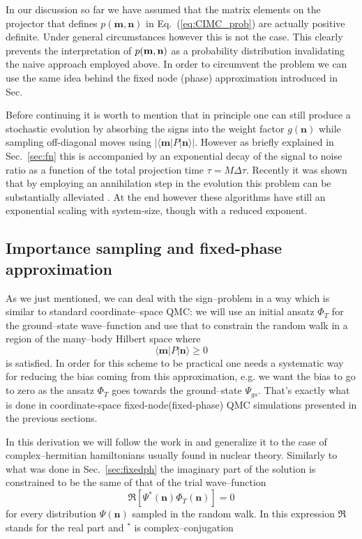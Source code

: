 In our discussion so far we have assumed that the matrix elements on the projector that defines $p(\mathbf{m},\mathbf{n})$ in Eq.~(\eqref{eq:CIMC_prob}) are
actually positive definite. Under general circumstances however this is not the case. This clearly prevents the interpretation 
of $p({\bf m},{\bf n})$ as a probability distribution invalidating the naive approach employed above. In order to circumvent the problem we can use the same idea behind the
fixed node (phase) approximation introduced in Sec.~\label{sec:fn}

Before continuing it is worth to mention that in principle one can still produce a stochastic evolution by absorbing the signs into the weight factor $g(\mathbf{n})$
while sampling off-diagonal moves using $\left \vert \langle \mathbf{m} \lvert P \rvert \mathbf{n} \rangle \right\vert$. However as briefly explained in Sec.~\ref{sec:fn} 
this is accompanied by an exponential decay of the signal to noise ratio as a function of the total projection time $\tau = M \Delta\tau$. Recently it was shown 
that by employing an annihilation step in the evolution this problem can be substantially alleviated \cite{Booth09,Petruzielo12,Booth13}. At the end however these 
algorithms have still an exponential scaling with system-size, though with a reduced exponent.

\subsection{Importance sampling and fixed-phase approximation}
\label{subsect:CCDMC-IS}
As we just mentioned, we can deal with the sign--problem in a way which is similar to standard coordinate--space QMC: we will use an initial ansatz $\Phi_T$ 
for the ground--state wave--function and use that to constrain the random walk in a region of the many--body Hilbert space where 
\begin{equation}
\langle \mathbf{m} \lvert P \rvert \mathbf{n} \rangle \geq 0
\end{equation}
is satisfied. In order for this scheme to be practical one needs a systematic way for reducing the bias coming from this approximation, e.g. we want the bias 
to go to zero as the ansatz $\Phi_T$ goes towards the ground--state $\Psi_{gs}$. That's exactly what is done in coordinate-space fixed-node(fixed-phase) QMC simulations 
presented in the previous sections.

In this derivation we will follow the work in \cite{TenHaaf95,Sorella00} and generalize it to the case of complex--hermitian hamiltonians usually found in nuclear theory.
Similarly to what was done in Sec.~\ref{sec:fixedph} the imaginary part of the solution is constrained to be the same of that of the trial wave--function
\begin{equation}
\Re [\Psi^*(\mathbf{n})\Phi_T(\mathbf{n})] = 0 
\end{equation}
for every distribution $\Psi(\mathbf{n})$ sampled in the random walk. In this expression $\Re$ stands for the real part and $^*$ is complex--conjugation

